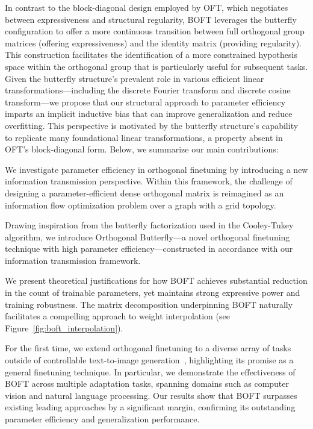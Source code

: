 In contrast to the block-diagonal design employed by OFT, which negotiates between expressiveness and structural regularity, BOFT leverages the butterfly configuration to offer a more continuous transition between full orthogonal group matrices (offering expressiveness) and the identity matrix (providing regularity). This construction facilitates the identification of a more constrained hypothesis space within the orthogonal group that is particularly useful for subsequent tasks. Given the butterfly structure’s prevalent role in various efficient linear transformations—including the discrete Fourier transform and discrete cosine transform—we propose that our structural approach to parameter efficiency imparts an implicit inductive bias that can improve generalization and reduce overfitting. This perspective is motivated by the butterfly structure's capability to replicate many foundational linear transformations, a property absent in OFT's block-diagonal form. Below, we summarize our main contributions:

\item We investigate parameter efficiency in orthogonal finetuning by introducing a new information transmission perspective. Within this framework, the challenge of designing a parameter-efficient dense orthogonal matrix is reimagined as an information flow optimization problem over a graph with a grid topology.

\item Drawing inspiration from the butterfly factorization used in the Cooley-Tukey algorithm, we introduce Orthogonal Butterfly—a novel orthogonal finetuning technique with high parameter efficiency—constructed in accordance with our information transmission framework.

\item We present theoretical justifications for how BOFT achieves substantial reduction in the count of trainable parameters, yet maintains strong expressive power and training robustness. The matrix decomposition underpinning BOFT naturally facilitates a compelling approach to weight interpolation (see Figure~\ref{fig:boft_interpolation}).

\item For the first time, we extend orthogonal finetuning to a diverse array of tasks outside of controllable text-to-image generation~\cite{qiu2023controlling}, highlighting its promise as a general finetuning technique. In particular, we demonstrate the effectiveness of BOFT across multiple adaptation tasks, spanning domains such as computer vision and natural language processing. Our results show that BOFT surpasses existing leading approaches by a significant margin, confirming its outstanding parameter efficiency and generalization performance.

